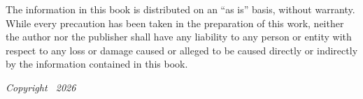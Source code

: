 \medskip

\noindent\small The information in this book is distributed on an ``as is''
basis, without warranty. While every precaution has been taken in the
preparation of this work, neither the author nor the publisher shall have
any liability to any person or entity with respect to any loss or damage
caused or alleged to be caused directly or indirectly by the information
contained in this book.

\medskip

\noindent\itshape Copyright \textcopyright\ 2026

\clearpage
